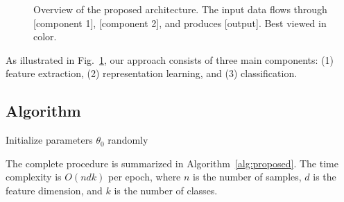 \documentclass[conference,10pt]{IEEEtran}
\begin{document}
\begin{figure}[t]
    \centering
    \caption{Overview of the proposed architecture. The input data flows
             through [component 1], [component 2], and produces [output].
             Best viewed in color.}
    \label{fig:architecture}
\end{figure}

As illustrated in Fig.~\ref{fig:architecture}, our approach consists of
three main components: (1) feature extraction, (2) representation
learning, and (3) classification.

\subsection{Algorithm}
\label{subsec:algorithm}

\begin{algorithm}[t]
    \caption{Proposed Method Name}
    \label{alg:proposed}

    Initialize parameters $\theta_0$ randomly\;
    \;
\end{algorithm}

The complete procedure is summarized in Algorithm~\ref{alg:proposed}.
The time complexity is $O(ndk)$ per epoch, where $n$ is the number of
samples, $d$ is the feature dimension, and $k$ is the number of classes.

\end{document}
